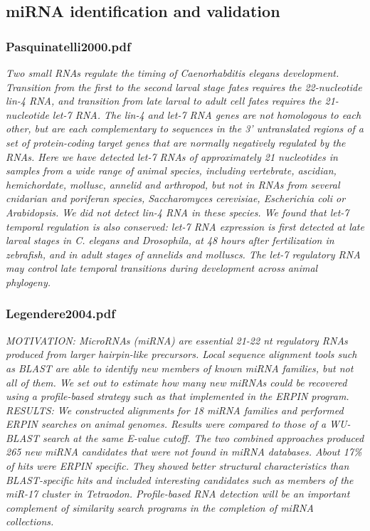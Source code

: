 \subsection{miRNA identification and validation}
\subsubsection{Pasquinatelli2000.pdf}
\cite{Pasquinelli2000}
\textit{Two small RNAs regulate the timing of Caenorhabditis elegans development. Transition from the first to the second larval stage fates requires the 22-nucleotide lin-4 RNA, and transition from late larval to adult cell fates requires the 21-nucleotide let-7 RNA. The lin-4 and let-7 RNA genes are not homologous to each other, but are each complementary to sequences in the 3' untranslated regions of a set of protein-coding target genes that are normally negatively regulated by the RNAs. Here we have detected let-7 RNAs of approximately 21 nucleotides in samples from a wide range of animal species, including vertebrate, ascidian, hemichordate, mollusc, annelid and arthropod, but not in RNAs from several cnidarian and poriferan species, Saccharomyces cerevisiae, Escherichia coli or Arabidopsis. We did not detect lin-4 RNA in these species. We found that let-7 temporal regulation is also conserved: let-7 RNA expression is first detected at late larval stages in C. elegans and Drosophila, at 48 hours after fertilization in zebrafish, and in adult stages of annelids and molluscs. The let-7 regulatory RNA may control late temporal transitions during development across animal phylogeny.}

\subsubsection{Legendere2004.pdf}
\cite{Legendre2005}
\textit{MOTIVATION: MicroRNAs (miRNA) are essential 21-22 nt regulatory RNAs produced from larger hairpin-like precursors. Local sequence alignment tools such as BLAST are able to identify new members of known miRNA families, but not all of them. We set out to estimate how many new miRNAs could be recovered using a profile-based strategy such as that implemented in the ERPIN program. RESULTS: We constructed alignments for 18 miRNA families and performed ERPIN searches on animal genomes. Results were compared to those of a WU-BLAST search at the same E-value cutoff. The two combined approaches produced 265 new miRNA candidates that were not found in miRNA databases. About 17{\%} of hits were ERPIN specific. They showed better structural characteristics than BLAST-specific hits and included interesting candidates such as members of the miR-17 cluster in Tetraodon. Profile-based RNA detection will be an important complement of similarity search programs in the completion of miRNA collections.}

